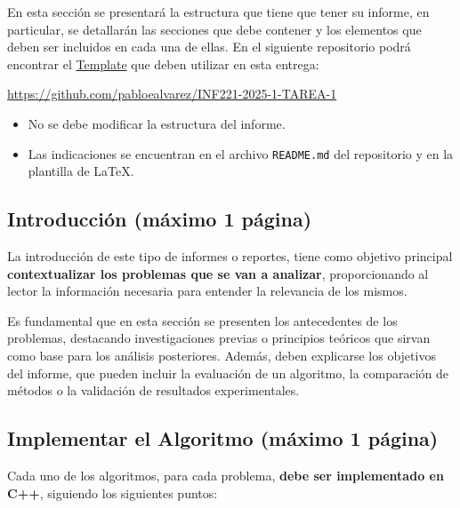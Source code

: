 En esta sección se presentará la estructura que tiene que tener su informe, en particular, se detallarán las secciones que debe contener y los elementos que deben ser incluidos en cada una de ellas. En el siguiente repositorio podrá encontrar el \href{https://github.com/pabloealvarez/INF221-2025-1-TAREA-1}{Template} que deben utilizar en esta entrega:

\begin{mdframed}

    \begin{center}
    {\Large
    \url{https://github.com/pabloealvarez/INF221-2025-1-TAREA-1}
    }    
\end{center}
\end{mdframed}

\begin{itemize}
    \item No se debe modificar la estructura del informe.
    \item Las indicaciones se encuentran en el archivo \texttt{README.md} del repositorio y en la plantilla de \LaTeX. 
\end{itemize}

\subsection{Introducción (máximo 1 página)}

La introducción de este tipo de informes o reportes, tiene como objetivo principal \textbf{contextualizar los problemas que se van a analizar}, proporcionando al lector la información necesaria para entender la relevancia de los mismos. 

Es fundamental que en esta sección se presenten los antecedentes de los problemas, destacando investigaciones previas o principios teóricos que sirvan como base para los análisis posteriores. Además, deben explicarse los objetivos del informe, que pueden incluir la evaluación de un algoritmo, la comparación de métodos o la validación de resultados experimentales.


\subsection{Implementar el Algoritmo (máximo 1 página)}

\begin{mdframed}
Cada uno de los algoritmos, para cada problema, \textbf{debe ser implementado en C++}, siguiendo los siguientes puntos:
\end{mdframed}

